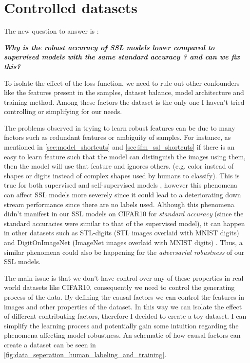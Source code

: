 \documentclass[../thesis.tex]{subfiles}
\begin{document}
\section{Controlled datasets}

The new question to answer is :

\textbf{\textit{Why is the robust accuracy of SSL models lower compared to supervised models with the same standard accuracy ? and can we fix this? }}

To isolate the effect of the loss function, we need to rule out other confounders like the features present in the samples, dataset balance, model architecture and training method. Among these factors the dataset is the only one I haven't tried controlling or simplifying for our needs.  

The problems observed in trying to learn robust features can be due to many factors such as
redundant features or ambiguity of samples. For instance, as mentioned in \ref{sec:model_shortcuts} and \ref{sec:ifm_ssl_shortcuts} if there is an easy to learn feature such that the model can distinguish the images using them, then the model will
use that feature and ignores others. (e.g. color instead of shapes or digits instead of complex shapes used by humans to classify). This is true for both supervised and self-supervised models , however this phenomena can affect SSL models more severely since it could lead to a deteriorating down stream performance since there are no labels used. Although this phenomena didn't manifest in our SSL models on CIFAR10 for \textit{standard accuracy} (since the standard accuracies were similar to that of the supervised model), it can happen in other datasets such as STL-digits (STL images overlaid with MNIST digits) \cite{ifm_ssl_avoid_shortcuts} and DigitOnImageNet (ImageNet images overlaid with MNIST digits) \cite{ssl_loss_shortcuts}. Thus, a similar phenomena could also be happening for the \textit{adversarial robustness} of our SSL models. 

The main issue is that we don’t have control over any of these
properties in real world datasets like CIFAR10, consequently we need to control the generating process of
the data. By defining the causal factors we can control the features in images and other
properties of the dataset. In this way we can isolate the effect of different contributing factors, therefore I decided to create a toy dataset. I can simplify the learning process and potentially gain some intuition regarding the phenomena affecting model robustness. An schematic of how causal factors can create a dataset can be seen in \ref{fig:data_seperation_human_labeling_and_training}.
\end{document}
